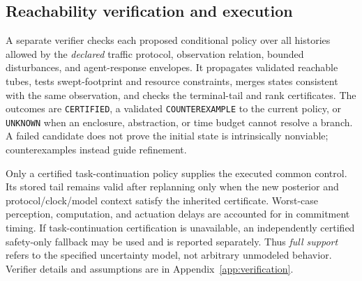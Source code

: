 \documentclass[letterpaper]{article} %
\begin{document}
\subsection{Reachability verification and execution}
\label{sec:verification}
A separate verifier checks each proposed conditional policy over all histories allowed by the \emph{declared} traffic protocol, observation relation, bounded disturbances, and agent-response envelopes. It propagates validated reachable tubes, tests swept-footprint and resource constraints, merges states consistent with the same observation, and checks the terminal-tail and rank certificates. The outcomes are \texttt{CERTIFIED}, a validated \texttt{COUNTEREXAMPLE} to the current policy, or \texttt{UNKNOWN} when an enclosure, abstraction, or time budget cannot resolve a branch. A failed candidate does not prove the initial state is intrinsically nonviable; counterexamples instead guide refinement.

Only a certified task-continuation policy supplies the executed common control. Its stored tail remains valid after replanning only when the new posterior and protocol/clock/model context satisfy the inherited certificate. Worst-case perception, computation, and actuation delays are accounted for in commitment timing. If task-continuation certification is unavailable, an independently certified safety-only fallback may be used and is reported separately. Thus \emph{full support} refers to the specified uncertainty model, not arbitrary unmodeled behavior. Verifier details and assumptions are in Appendix~\ref{app:verification}.
\end{document}
